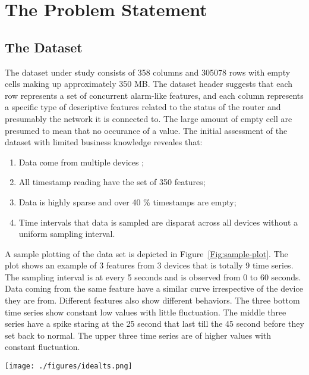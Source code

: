 \chapter{The Problem Statement}

\section{The Dataset}

The dataset under study consists of 358 columns and 305078 rows with empty cells making up approximately 350 MB. The dataset header suggests that each row represents a set of concurrent alarm-like features, and each column represents a specific type of descriptive features related to the status of the router and  presumably the network it is connected to. The large amount of empty cell are presumed to mean that no occurance of a value. The initial assessment of the dataset with limited business knowledge reveales that:


\begin{enumerate}
	\item Data come from multiple devices ;
	\item All timestamp reading have the set of 350 features;
	\item Data is highly sparse and over 40 \% timestamps are empty;
	\item Time intervals that data is sampled are disparat across all devices without a uniform sampling interval. 
\end{enumerate}

A sample plotting of the data set is depicted in Figure~\ref{Fig:sample-plot}. The plot shows an example of 3 features from 3 devices that is totally 9 time series. The sampling interval is at every 5 seconds and is observed from 0 to 60 seconds. Data coming from the same feature have a similar curve irrespective of the device they are from. Different features also show different behaviors. The three bottom time series show constant low values with little fluctuation.  The middle three series have a spike staring at the 25 second that last till the 45 second before they set back to normal. The upper three time series are of higher values with constant fluctuation.   

\begin{figure*}
	\texttt{[image: ./figures/idealts.png]}
	\caption{Plots of 9 time series of 3 features on 3 devices}
	\label{Fig:sample-plot}
\end{figure*}


